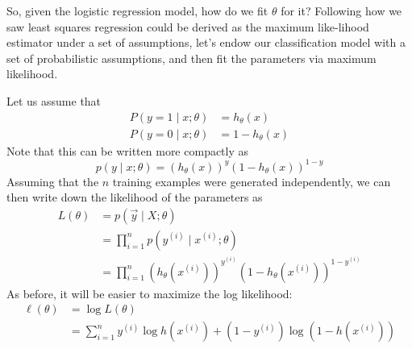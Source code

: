 So, given the logistic regression model, how do we fit $\theta$ for it? Following
how we saw least squares regression could be derived as the maximum like-lihood
estimator under a set of assumptions, let's endow our classification
model with a set of probabilistic assumptions, and then fit the parameters
via maximum likelihood.

Let us assume that
\begin{align*}
    P(y = 1 \mid x;\theta) &= h_\theta (x)\\
    P(y = 0 \mid x;\theta) &= 1 - h_\theta (x)
\end{align*}
Note that this can be written more compactly as
\begin{equation}
    p(y \mid x;\theta) = (h_\theta (x))^y (1 - h_\theta (x))^{1-y}
\end{equation}
Assuming that the $n$ training examples were generated independently, we
can then write down the likelihood of the parameters as
\begin{align}
    L(\theta) &= p(\vec y \mid X;\theta)\\
    &= \prod^n_{i=1} p(y^{(i)} \mid x^{(i)} ;\theta)\\
    &= \prod^n_{i=1} \left( h_\theta(x^{(i)}) \right)^{y^{(i)}} \left( 1 - h_\theta (x^{(i)}) \right)^{1-y^{(i)}}
\end{align}
As before, it will be easier to maximize the log likelihood:
\begin{align}
    \ell(\theta) &= \log L(\theta)\\
    &= \sum_{i=1}^n y^{(i)} \log h(x^{(i)}) + (1 - y^{(i)})\log(1 - h(x^{(i)}))
\end{align}

